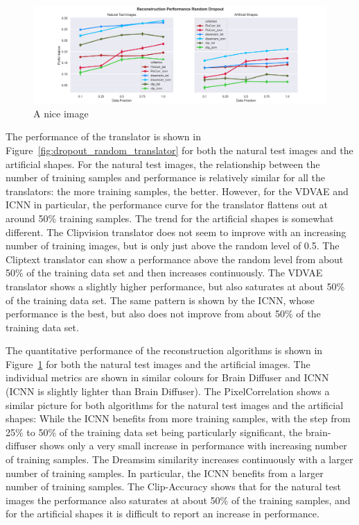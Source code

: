 \begin{figure}[ht]
    \centering
    \includegraphics[width=1\textwidth]{plots/dropout_random_reconstruction.png}
    \caption{A nice image}\label{fig:dropout_random_reconstruction}
\end{figure}

The performance of the translator is shown in Figure~\ref{fig:dropout_random_translator} for both the natural test images and the artificial shapes. For the natural test images, the relationship between the number of training samples and performance is relatively similar for all the translators: the more training samples, the better. However, for the VDVAE and ICNN in particular, the performance curve for the translator flattens out at around 50\% training samples. The trend for the artificial shapes is somewhat different. The Clipvision translator does not seem to improve with an increasing number of training images, but is only just above the random level of 0.5. The Cliptext translator can show a performance above the random level from about 50\% of the training data set and then increases continuously. The VDVAE translator shows a slightly higher performance, but also saturates at about 50\% of the training data set. The same pattern is shown by the ICNN, whose performance is the best, but also does not improve from about 50\% of the training data set. 

The quantitative performance of the reconstruction algorithms is shown in Figure~\ref{fig:dropout_random_reconstruction} for both the natural test images and the artificial images. The individual metrics are shown in similar colours for Brain Diffuser and ICNN (ICNN is slightly lighter than Brain Diffuser). The PixelCorrelation shows a similar picture for both algorithms for the natural test images and the artificial shapes: While the ICNN benefits from more training samples, with the step from 25\% to 50\% of the training data set being particularly significant, the brain-diffuser shows only a very small increase in performance with increasing number of training samples. The Dreamsim similarity increases continuously with a larger number of training samples. In particular, the ICNN benefits from a larger number of training samples. The Clip-Accuracy shows that for the natural test images the performance also saturates at about 50\% of the training samples, and for the artificial shapes it is difficult to report an increase in performance.

